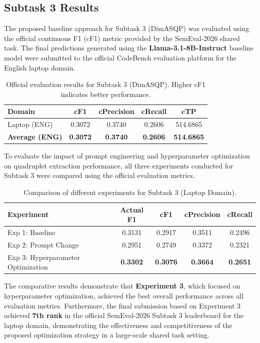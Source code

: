 \documentclass{article}
\begin{document}
\subsection{Subtask 3 Results}

The proposed baseline approach for Subtask 3 (DimASQP) was evaluated using the official continuous F1 (cF1) metric provided by the SemEval-2026 shared task. The final predictions generated using the \textbf{Llama-3.1-8B-Instruct} baseline model were submitted to the official CodeBench evaluation platform for the English laptop domain.

\begin{table}[htbp]
\centering
\caption{Official evaluation results for Subtask 3 (DimASQP). Higher cF1 indicates better performance.}
\label{tab:subtask3_results}
\begin{tabular}{lcccc}
\hline
\textbf{Domain} & \textbf{cF1} & \textbf{cPrecision} & \textbf{cRecall} & \textbf{cTP} \\
\hline
Laptop (ENG) & 0.3072 & 0.3740 & 0.2606 & 514.6865 \\
\hline
\textbf{Average (ENG)} & \textbf{0.3072} & \textbf{0.3740} & \textbf{0.2606} & \textbf{514.6865} \\
\hline
\end{tabular}
\end{table}


To evaluate the impact of prompt engineering and hyperparameter optimization on quadruplet extraction performance, all three experiments conducted for Subtask 3 were compared using the official evaluation metrics.

\begin{table}[htbp]
\centering
\caption{Comparison of different experiments for Subtask 3 (Laptop Domain).}
\label{tab:subtask3_experiments}
\begin{tabular}{lcccc}
\hline
\textbf{Experiment} & \textbf{Actual F1} & \textbf{cF1} & \textbf{cPrecision} & \textbf{cRecall} \\
\hline
Exp 1: Baseline & 0.3131 & 0.2917 & 0.3511 & 0.2496 \\
Exp 2: Prompt Change & 0.2951 & 0.2749 & 0.3372 & 0.2321 \\
Exp 3: Hyperparameter Optimization & \textbf{0.3302} & \textbf{0.3076} & \textbf{0.3664} & \textbf{0.2651} \\
\hline
\end{tabular}
\end{table}

The comparative results demonstrate that \textbf{Experiment 3}, which focused on hyperparameter optimization, achieved the best overall performance across all evaluation metrics. Furthermore, the final submission based on Experiment 3 achieved \textbf{7th rank} in the official SemEval-2026 Subtask 3 leaderboard for the laptop domain, demonstrating the effectiveness and competitiveness of the proposed optimization strategy in a large-scale shared task setting.
\end{document}
